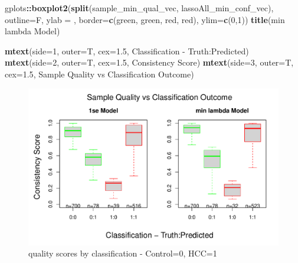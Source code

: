 \documentclass[
]{book}
\newenvironment{Shaded}{\begin{snugshade}}{\end{snugshade}}
\newcommand{\DataTypeTok}[1]{\textcolor[rgb]{0.13,0.29,0.53}{#1}}
\newcommand{\DecValTok}[1]{\textcolor[rgb]{0.00,0.00,0.81}{#1}}
\newcommand{\FloatTok}[1]{\textcolor[rgb]{0.00,0.00,0.81}{#1}}
\newcommand{\KeywordTok}[1]{\textcolor[rgb]{0.13,0.29,0.53}{\textbf{#1}}}
\newcommand{\NormalTok}[1]{#1}
\newcommand{\OperatorTok}[1]{\textcolor[rgb]{0.81,0.36,0.00}{\textbf{#1}}}
\newcommand{\StringTok}[1]{\textcolor[rgb]{0.31,0.60,0.02}{#1}}
\begin{document}
\begin{Shaded}
\begin{Highlighting}[]
\NormalTok{gplots}\OperatorTok{::}\KeywordTok{boxplot2}\NormalTok{(}\KeywordTok{split}\NormalTok{(sample\_min\_qual\_vec, lassoAll\_min\_conf\_vec), }
  \DataTypeTok{outline=}\NormalTok{F, }\DataTypeTok{ylab =} \StringTok{\textquotesingle{}\textquotesingle{}}\NormalTok{,}
  \DataTypeTok{border=}\KeywordTok{c}\NormalTok{(}\StringTok{\textquotesingle{}green\textquotesingle{}}\NormalTok{, }\StringTok{\textquotesingle{}green\textquotesingle{}}\NormalTok{, }\StringTok{\textquotesingle{}red\textquotesingle{}}\NormalTok{, }\StringTok{\textquotesingle{}red\textquotesingle{}}\NormalTok{),}
  \DataTypeTok{ylim=}\KeywordTok{c}\NormalTok{(}\DecValTok{0}\NormalTok{,}\DecValTok{1}\NormalTok{))}
\KeywordTok{title}\NormalTok{(}\StringTok{\textquotesingle{}min lambda Model\textquotesingle{}}\NormalTok{)}


\KeywordTok{mtext}\NormalTok{(}\DataTypeTok{side=}\DecValTok{1}\NormalTok{, }\DataTypeTok{outer=}\NormalTok{T, }\DataTypeTok{cex=}\FloatTok{1.5}\NormalTok{, }\StringTok{\textquotesingle{}Classification {-} Truth:Predicted\textquotesingle{}}\NormalTok{)}
\KeywordTok{mtext}\NormalTok{(}\DataTypeTok{side=}\DecValTok{2}\NormalTok{, }\DataTypeTok{outer=}\NormalTok{T, }\DataTypeTok{cex=}\FloatTok{1.5}\NormalTok{, }\StringTok{\textquotesingle{}Consistency Score\textquotesingle{}}\NormalTok{)}
\KeywordTok{mtext}\NormalTok{(}\DataTypeTok{side=}\DecValTok{3}\NormalTok{, }\DataTypeTok{outer=}\NormalTok{T, }\DataTypeTok{cex=}\FloatTok{1.5}\NormalTok{, }\StringTok{\textquotesingle{}Sample Quality vs Classification Outcome\textquotesingle{}}\NormalTok{)}
\end{Highlighting}
\end{Shaded}

\begin{figure}
\centering
\includegraphics{Static/figures/hcc5hmC-glmnetSuite-plot-qual-conf-1.pdf}
\caption{\label{fig:hcc5hmC-glmnetSuite-plot-qual-conf}quality scores by classification - Control=0, HCC=1}
\end{figure}
\end{document}
